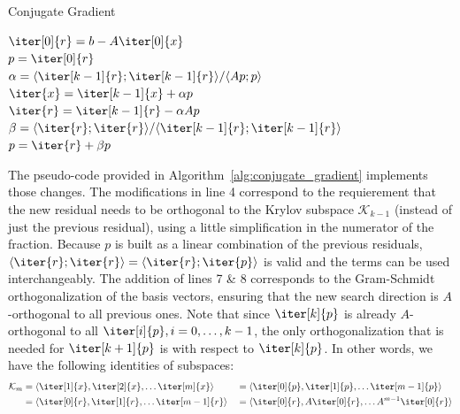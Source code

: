 \begin{algorithm}[h]
  \caption{Conjugate Gradient}
  \label{alg:conjugate_gradient}
  \SetAlgoLined
  \DontPrintSemicolon
  $\iter[0]{r} = b-A\iter[0]{x}$ \\
  $p = \iter[0]{r}$ \\
   {
    $\alpha = \langle \iter[k-1]{r};\iter[k-1]{r} \rangle / \langle Ap;p \rangle$ \\
    $\iter{x} = \iter[k-1]{x}+\alpha p$ \\
    $\iter{r} = \iter[k-1]{r} - \alpha Ap$ \\
    $\beta = \langle \iter{r};\iter{r} \rangle / \langle \iter[k-1]{r};\iter[k-1]{r} \rangle$ \\
    $p = \iter{r} + \beta p$ \\
  }
\end{algorithm}

\noindent The pseudo-code provided in Algorithm~\hyperref[alg:conjugate_gradient]{\ref{alg:conjugate_gradient}} implements those changes. The modifications in line 4 correspond to the requierement that the new residual needs to be orthogonal to the Krylov subspace $\mathcal{K}_{k-1}$ (instead of just the previous residual), using a little simplification in the numerator of the fraction. Because $p$ is built as a linear combination of the previous residuals, $\langle \iter{r};\iter{r} \rangle = \langle \iter{r};\iter{p} \rangle$ is valid and the terms can be used interchangeably. The addition of lines 7 \& 8 corresponds to the Gram-Schmidt orthogonalization of the basis vectors, ensuring that the new search direction is $A$-orthogonal to all previous ones. Note that since $\iter[k]{p}$ is already $A$-orthogonal to all $\iter[i]{p}, i=0,\dots,k-1$, the only orthogonalization that is needed for $\iter[k+1]{p}$ is with respect to $\iter[k]{p}$. In other words, we have the following identities of subspaces:
\begin{equation}
  \begin{aligned}
    \mathcal{K}_m 
    & =\langle \iter[1]{x}, \iter[2]{x}, \dots \iter[m]{x} \rangle 
   & & = \langle \iter[0]{p}, \iter[1]{p}, \dots \iter[m-1]{p} \rangle \\
    & = \langle \iter[0]{r}, \iter[1]{r}, \dots \iter[m-1]{r} \rangle
   & & =\langle \iter[0]{r}, A\iter[0]{r}, \dots A^{m-1}\iter[0]{r}\rangle\\
  \end{aligned}
\end{equation}

